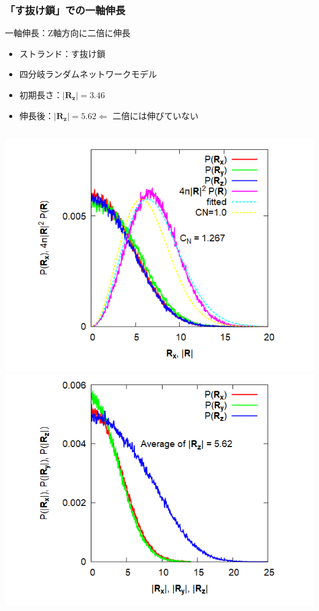 \documentclass[12pt, dvipdfmx]{beamer}
\begin{document}
\begin{frame}
	\frametitle{「す抜け鎖」での一軸伸長}
		\begin{exampleblock}{一軸伸長：Z軸方向に二倍に伸長}
			\begin{itemize}
				\item ストランド：す抜け鎖
				\item 四分岐ランダムネットワークモデル
				\item 初期長さ：$|\bm{R_z}| = 3.46$
				\item 伸長後：$|\bm{R_z}| = 5.62 \Leftarrow$ \alert{二倍には伸びていない}
			\end{itemize}
		\end{exampleblock}
		\begin{columns}[totalwidth=\linewidth]
				\includegraphics[width=1.1\columnwidth]{4chain_E2E_init.png}
				\includegraphics[width=1.1\columnwidth]{Expand_4_Strand_histgram.png}
		\end{columns}
\end{frame}
\end{document}
